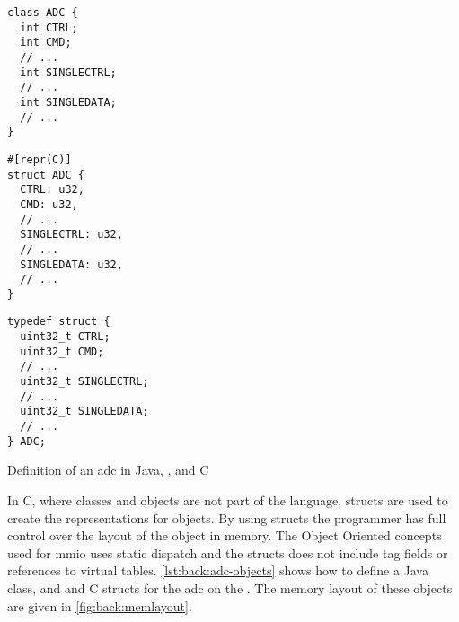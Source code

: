 \begin{listing}[H]
  \centering
  \begin{minipage}{0.31\textwidth}
  \begin{listing}
    \begin{verbatim}
class ADC {
  int CTRL;
  int CMD;
  // ...
  int SINGLECTRL;
  // ...
  int SINGLEDATA;
  // ...
}
    \end{verbatim}
  \end{listing}
  \end{minipage}
  \hfill
  \begin{minipage}{0.31\textwidth}
  \begin{listing}
    \begin{verbatim}
#[repr(C)]
struct ADC {
  CTRL: u32,
  CMD: u32,
  // ...
  SINGLECTRL: u32,
  // ...
  SINGLEDATA: u32,
  // ...
}
    \end{verbatim}
  \end{listing}
  \end{minipage}
  \hfill
  \begin{minipage}{0.31\textwidth}
  \begin{listing}
    \begin{verbatim}
typedef struct {
  uint32_t CTRL;
  uint32_t CMD;
  // ...
  uint32_t SINGLECTRL;
  // ...
  uint32_t SINGLEDATA;
  // ...
} ADC;
    \end{verbatim}
  \end{listing}
  \end{minipage}

  \caption{Definition of an \gls{adc} in Java, {\rust}, and C}
  \label{lst:back:adc-objects}
\end{listing}


In C, where classes and objects are not part of the language, structs are used to create the representations for objects.
By using structs the programmer has full control over the layout of the object in memory.
The Object Oriented concepts used for \gls{mmio} uses static dispatch and the structs does not include tag fields or references to virtual tables.
\autoref{lst:back:adc-objects} shows how to define a Java class, and {\rust} and C structs for the \gls{adc} on the {\gecko}.
The memory layout of these objects are given in \autoref{fig:back:memlayout}.

